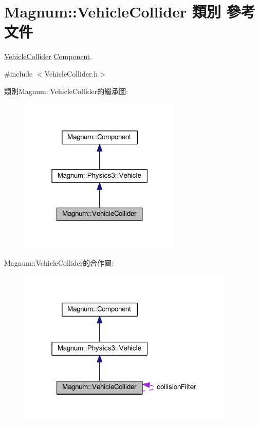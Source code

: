 \hypertarget{class_magnum_1_1_vehicle_collider}{}\section{Magnum\+:\+:Vehicle\+Collider 類別 參考文件}
\label{class_magnum_1_1_vehicle_collider}


\hyperlink{class_magnum_1_1_vehicle_collider}{Vehicle\+Collider} \hyperlink{class_magnum_1_1_component}{Component}.  




{\ttfamily \#include $<$Vehicle\+Collider.\+h$>$}



類別\+Magnum\+:\+:Vehicle\+Collider的繼承圖\+:\nopagebreak
\begin{figure}[H]
\begin{center}
\leavevmode
\includegraphics[width=219pt]{class_magnum_1_1_vehicle_collider__inherit__graph}
\end{center}
\end{figure}


Magnum\+:\+:Vehicle\+Collider的合作圖\+:\nopagebreak
\begin{figure}[H]
\begin{center}
\leavevmode
\includegraphics[width=291pt]{class_magnum_1_1_vehicle_collider__coll__graph}
\end{center}
\end{figure}
